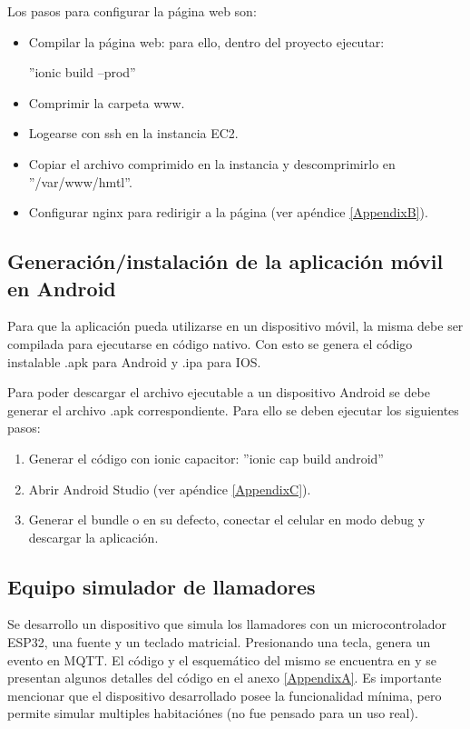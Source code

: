 Los pasos para configurar la página web son:
\begin{itemize}
\item Compilar la página web: para ello, dentro del proyecto ejecutar:

''ionic build --prod''
\item Comprimir la carpeta www.
\item Logearse con ssh en la instancia EC2.
\item Copiar el archivo comprimido en la instancia y descomprimirlo en ''/var/www/hmtl''.
\item Configurar nginx para redirigir a la página (ver apéndice \ref{AppendixB}).

\end{itemize}

\subsection{Generación/instalación de la aplicación móvil en Android}

Para que la aplicación pueda utilizarse en un dispositivo móvil, la misma debe ser compilada para ejecutarse en código nativo. Con esto se genera el código instalable .apk para Android y .ipa para IOS. 

Para poder descargar el archivo ejecutable a un dispositivo Android se debe generar el archivo .apk correspondiente. Para ello se deben ejecutar los siguientes pasos:

\begin{enumerate}

\item Generar el código con ionic capacitor:
''ionic cap build android''
\item Abrir Android Studio (ver apéndice \ref{AppendixC}).
\item Generar el bundle o en su defecto, conectar el celular en modo debug y descargar la aplicación. 
\end{enumerate}
\pagebreak


\subsection{Equipo simulador de llamadores}

Se desarrollo un dispositivo que simula los llamadores con un microcontrolador ESP32, una fuente y un teclado matricial. Presionando una tecla, genera un evento en MQTT. El código y el esquemático del mismo se encuentra en \citep{WEBSITE:33} y se presentan algunos detalles del código en el anexo \ref{AppendixA}. Es importante mencionar que el dispositivo desarrollado posee la funcionalidad mínima, pero permite simular multiples habitaciónes (no fue pensado para un uso real).


